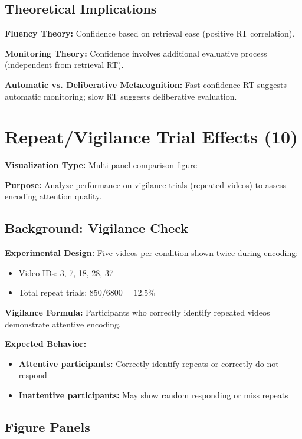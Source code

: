 \documentclass[12pt,a4paper]{article}
\begin{document}
\subsection{Theoretical Implications}

\textbf{Fluency Theory:} Confidence based on retrieval ease (positive RT correlation).

\textbf{Monitoring Theory:} Confidence involves additional evaluative process (independent from retrieval RT).

\textbf{Automatic vs. Deliberative Metacognition:} Fast confidence RT suggests automatic monitoring; slow RT suggests deliberative evaluation.

\newpage
\section{Repeat/Vigilance Trial Effects (10)}

\textbf{Visualization Type:} Multi-panel comparison figure

\textbf{Purpose:} Analyze performance on vigilance trials (repeated videos) to assess encoding attention quality.

\subsection{Background: Vigilance Check}

\textbf{Experimental Design:} Five videos per condition shown twice during encoding:
\begin{itemize}
    \item Video IDs: 3, 7, 18, 28, 37
    \item Total repeat trials: $850/6800 = 12.5\%$
\end{itemize}

\textbf{Vigilance Formula:} Participants who correctly identify repeated videos demonstrate attentive encoding.

\textbf{Expected Behavior:}
\begin{itemize}
    \item \textbf{Attentive participants:} Correctly identify repeats or correctly do not respond
    \item \textbf{Inattentive participants:} May show random responding or miss repeats
\end{itemize}

\subsection{Figure Panels}
\end{document}
